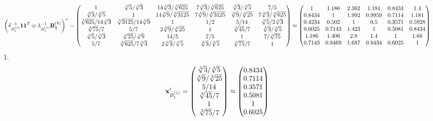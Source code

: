 \documentclass[10pt,a4paper]{article}
\begin{document}
	\[
		\left(\delta_{B_1^{(1)}}^{-1}\bold{11}^T \oplus \lambda_{B_1^{(1)}}^{-1}\bold{B_1^{(1)}}\right)^* = 
		\begin{pmatrix}
			{1}{} & {\sqrt[3]{5}} / {\sqrt[3]{3}} & {{14}\sqrt[3]{3}} / {\sqrt[3]{625}} & {{7}\sqrt[3]{3}} / {\sqrt[3]{625}} & {\sqrt[3]{3}} / {\sqrt[3]{5}} & {{7}} / {{5}} \\
			{\sqrt[3]{3}} / {\sqrt[3]{5}} & {1}{} & {{14}\sqrt[3]{9}} / {\sqrt[3]{3125}} & {{7}\sqrt[3]{9}} / {\sqrt[3]{3125}} & {\sqrt[3]{9}} / {\sqrt[3]{25}} & {{7}\sqrt[3]{3}} / {\sqrt[3]{625}} \\
			{\sqrt[3]{625}} / {{14}\sqrt[3]{3}} & {\sqrt[3]{3125}} / {{14}\sqrt[3]{9}} & {1}{} & {1} / {{2}} & {{5}} / {{14}} & {\sqrt[3]{5}} / {{2}\sqrt[3]{3}} \\
			{\sqrt[3]{75}} / {{7}} & {{5}} / {{7}} & {{2}\sqrt[3]{9}} / {\sqrt[3]{25}} & {1}{} & {\sqrt[3]{45}} / {{7}} & {\sqrt[3]{3}} / {\sqrt[3]{5}} \\
			{\sqrt[3]{5}} / {\sqrt[3]{3}} & {\sqrt[3]{25}} / {\sqrt[3]{9}} & {{14}} / {{5}} & {{7}} / {{5}} & {1}{} & {{7}} / {\sqrt[3]{75}} \\
			{{5}} / {{7}} & {\sqrt[3]{625}} / {{7}\sqrt[3]{3}} & {{2}\sqrt[3]{3}} / {\sqrt[3]{5}} & {\sqrt[3]{3}} / {\sqrt[3]{5}} & {\sqrt[3]{75}} / {{7}} & {1}{} \\
		\end{pmatrix}
		\approx
		\begin{pmatrix}
			1        & 1.186    & 2.362    & 1.181    & 0.8434   & 1.4      \\
			0.8434   & 1        & 1.992    & 0.9959   & 0.7114   & 1.181    \\
			0.4234   & 0.502    & 1        & 0.5      & 0.3571   & 0.5928   \\
			0.6025   & 0.7143   & 1.423    & 1        & 0.5081   & 0.8434   \\
			1.186    & 1.406    & 2.8      & 1.4      & 1        & 1.66     \\
			0.7143   & 0.8469   & 1.687    & 0.8434   & 0.6025   & 1        \\
		\end{pmatrix}
	\]
	1.
	\[
		\bold{x}'_{B_1^{(1)}} = 
		\begin{pmatrix}
			{\sqrt[3]{3}} / {\sqrt[3]{5}} \\
			{\sqrt[3]{9}} / {\sqrt[3]{25}} \\
			{{5}} / {{14}} \\
			{\sqrt[3]{45}} / {{7}} \\
			{1}{} \\
			{\sqrt[3]{75}} / {{7}} \\
		\end{pmatrix}
		\approx
		\begin{pmatrix}
			0.8434   \\
			0.7114   \\
			0.3571   \\
			0.5081   \\
			1        \\
			0.6025   \\
		\end{pmatrix}
	\]
\end{document}
